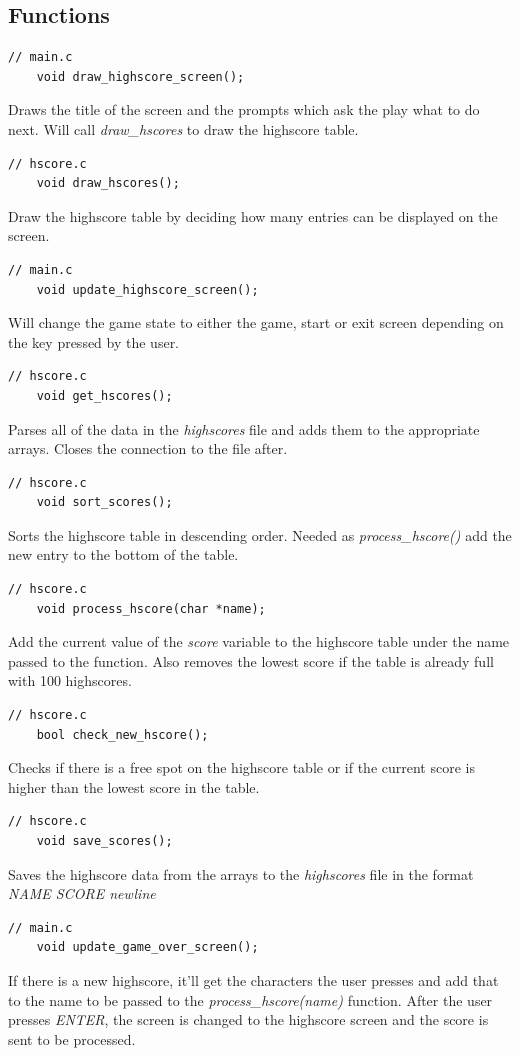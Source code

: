 \documentclass{article}
\begin{document}
\subsection*{Functions}
\begin{lstlisting}[style=CStyle]
	// main.c
	void draw_highscore_screen();
\end{lstlisting}
Draws the title of the screen and the prompts which ask the play what to do next. Will call \emph{draw\_hscores} to draw the highscore table.
\begin{lstlisting}[style=CStyle]
	// hscore.c
	void draw_hscores();
\end{lstlisting}
Draw the highscore table by deciding how many entries can be displayed on the screen. 
\begin{lstlisting}[style=CStyle]
	// main.c
	void update_highscore_screen();
\end{lstlisting}
Will change the game state to either the game, start or exit screen depending on the key pressed by the user.
\begin{lstlisting}[style=CStyle]
	// hscore.c
	void get_hscores();
\end{lstlisting}
Parses all of the data in the \emph{highscores} file and adds them to the appropriate arrays. Closes the connection to the file after.
\begin{lstlisting}[style=CStyle]
	// hscore.c
	void sort_scores();
\end{lstlisting}
Sorts the highscore table in descending order. Needed as \emph{process\_hscore()} add the new entry to the bottom of the table.
\begin{lstlisting}[style=CStyle]
	// hscore.c
	void process_hscore(char *name);
\end{lstlisting}
Add the current value of the \emph{score} variable to the highscore table under the name passed to the function. Also removes the lowest score if the table is already full with 100 highscores.
\begin{lstlisting}[style=CStyle]
	// hscore.c
	bool check_new_hscore();
\end{lstlisting}
Checks if there is a free spot on the highscore table or if the current score is higher than the lowest score in the table.
\begin{lstlisting}[style=CStyle]
	// hscore.c
	void save_scores();
\end{lstlisting}
Saves the highscore data from the arrays to the \emph{highscores} file in the format \emph{NAME SCORE newline}
\begin{lstlisting}[style=CStyle]
	// main.c
	void update_game_over_screen();
\end{lstlisting}
If there is a new highscore, it'll get the characters the user presses and add that to the name to be passed to the \emph{process\_hscore(name)} function. After the user presses \emph{ENTER}, the screen is changed to the highscore screen and the score is sent to be processed. 
\end{document}
